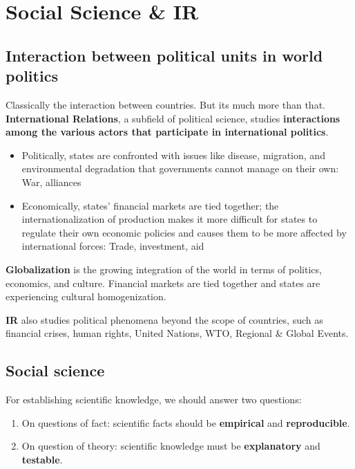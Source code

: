 \documentclass[
]{book}
\begin{document}
\hypertarget{social-science-ir}{%
\chapter{Social Science \& IR}\label{social-science-ir}}

\hypertarget{interaction-between-political-units-in-world-politics}{%
\section{Interaction between political units in world politics}\label{interaction-between-political-units-in-world-politics}}

Classically the interaction between countries. But its much more than that. \textbf{International Relations}, a subfield of political science, studies \textbf{interactions among the various actors that participate in international politics}.

\begin{itemize}
\item
  Politically, states are confronted with issues like disease, migration, and environmental degradation that governments cannot manage on their own: War, alliances
\item
  Economically, states' financial markets are tied together; the internationalization of production makes it more difficult for states to regulate their own economic policies and causes them to be more affected by international forces: Trade, investment, aid
\end{itemize}

\textbf{Globalization} is the growing integration of the world in terms of politics, economics, and culture. Financial markets are tied together and states are experiencing cultural homogenization.

\textbf{IR} also studies political phenomena beyond the scope of countries, such as financial crises, human rights, United Nations, WTO, Regional \& Global Events.

\hypertarget{social-science}{%
\section{Social science}\label{social-science}}

For establishing scientific knowledge, we should answer two questions:

\begin{enumerate}
\def\labelenumi{\arabic{enumi}.}
\item
  On questions of fact: scientific facts should be \textbf{empirical} and \textbf{reproducible}.
\item
  On question of theory: scientific knowledge must be \textbf{explanatory} and \textbf{testable}.
\end{enumerate}
\end{document}
